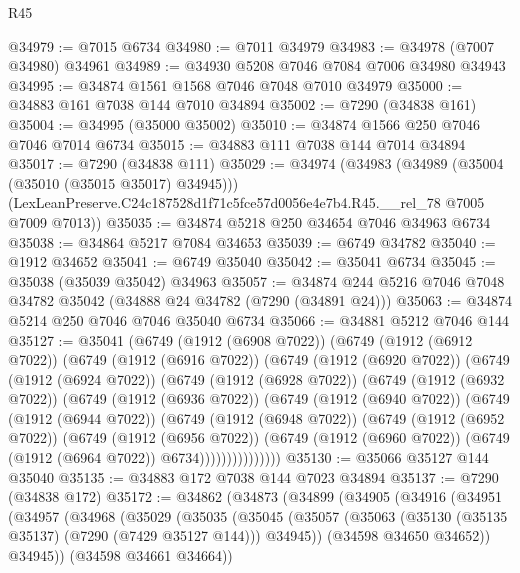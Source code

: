\begin{lexlean}{R45}
\begin{coremodule}
{@34979 := @7015 @6734
@34980 := @7011 @34979
@34983 := @34978 (@7007 @34980) @34961
@34989 := @34930 @5208 @7046 @7084 @7006 @34980 @34943
@34995 := @34874 @1561 @1568 @7046 @7048 @7010 @34979
@35000 := @34883 @161 @7038 @144 @7010 @34894
@35002 := @7290 (@34838 @161)
@35004 := @34995 (@35000 @35002)
@35010 := @34874 @1566 @250 @7046 @7046 @7014 @6734
@35015 := @34883 @111 @7038 @144 @7014 @34894
@35017 := @7290 (@34838 @111)
@35029 := @34974
    (@34983
      (@34989 (@35004 (@35010 (@35015 @35017) @34945)))
      (LexLeanPreserve.C24c187528d1f71c5fce57d0056e4e7b4.R45.__rel_78 @7005 @7009 @7013))
@35035 := @34874 @5218 @250 @34654 @7046 @34963 @6734
@35038 := @34864 @5217 @7084 @34653
@35039 := @6749 @34782
@35040 := @1912 @34652
@35041 := @6749 @35040
@35042 := @35041 @6734
@35045 := @35038 (@35039 @35042) @34963
@35057 := @34874 @244 @5216 @7046 @7048 @34782 @35042 (@34888 @24 @34782 (@7290 (@34891 @24)))
@35063 := @34874 @5214 @250 @7046 @7046 @35040 @6734
@35066 := @34881 @5212 @7046 @144
@35127 := @35041
    (@6749
      (@1912 (@6908 @7022))
      (@6749
        (@1912 (@6912 @7022))
        (@6749
          (@1912 (@6916 @7022))
          (@6749
            (@1912 (@6920 @7022))
            (@6749
              (@1912 (@6924 @7022))
              (@6749
                (@1912 (@6928 @7022))
                (@6749
                  (@1912 (@6932 @7022))
                  (@6749
                    (@1912 (@6936 @7022))
                    (@6749
                      (@1912 (@6940 @7022))
                      (@6749
                        (@1912 (@6944 @7022))
                        (@6749
                          (@1912 (@6948 @7022))
                          (@6749
                            (@1912 (@6952 @7022))
                            (@6749
                              (@1912 (@6956 @7022))
                              (@6749
                                (@1912 (@6960 @7022))
                                (@6749 (@1912 (@6964 @7022)) @6734)))))))))))))))
@35130 := @35066 @35127 @144 @35040
@35135 := @34883 @172 @7038 @144 @7023 @34894
@35137 := @7290 (@34838 @172)
@35172 := @34862
    (@34873
      (@34899
        (@34905
          (@34916
            (@34951
              (@34957
                (@34968
                  (@35029
                    (@35035
                      (@35045
                        (@35057
                          (@35063 (@35130 (@35135 @35137) (@7290 (@7429 @35127 @144))) @34945))
                        (@34598 @34650 @34652))
                      @34945))
                  (@34598 @34661 @34664))
}
\end{coremodule}
\end{lexlean}
